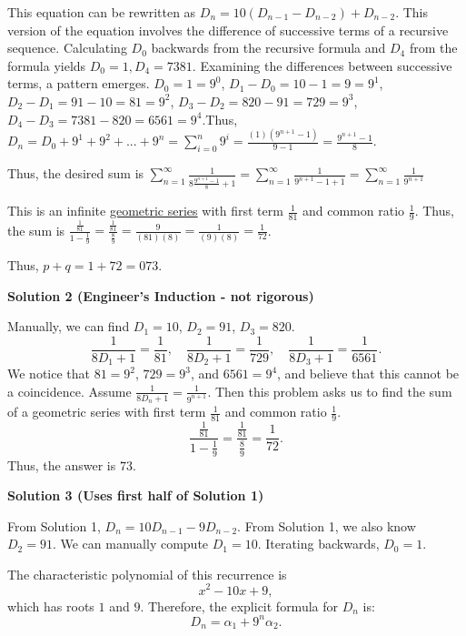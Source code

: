 \begin{enumerate}
 This equation can be rewritten as $D_{n}=10(D_{n-1}-D_{n-2}) + D_{n-2}$. This version of the equation involves the difference of successive terms of a recursive sequence. Calculating $D_{0}$ backwards from the recursive formula and $D_{4}$ from the formula yields $D_{0}=1, D_{4}=7381$. Examining the differences between successive terms, a pattern emerges. $D_{0}=1=9^{0}$, $D_{1}-D_{0}=10-1=9=9^{1}$, $D_{2}-D_{1}=91-10=81=9^{2}$, $D_{3}-D_{2}=820-91=729=9^{3}$, $D_{4}-D_{3}=7381-820=6561=9^{4}$.Thus, $D_{n}=D_{0} + 9^{1}+9^{2}+ . . . +9^{n}=\sum_{i=0}^{n}9^{i}=\frac{(1)(9^{n+1}-1)}{9-1}=\frac{9^{n+1}-1}{8}$.

 Thus, the desired sum is $\sum_{n=1}^{\infty}\frac{1}{8\frac{9^{n+1}-1}{8}+1}=\sum_{n=1}^{\infty}\frac{1}{9^{n+1}-1+1} = \sum_{n=1}^{\infty}\frac{1}{9^{n+1}}$

 This is an infinite \href{https://artofproblemsolving.com/wiki/index.php?title=Geometric\_series}{geometric series} with first term $\frac{1}{81}$ and common ratio $\frac{1}{9}$. Thus, the sum is $\frac{\frac{1}{81}}{1-\frac{1}{9}}=\frac{\frac{1}{81}}{\frac{8}{9}}=\frac{9}{(81)(8)}=\frac{1}{(9)(8)}=\frac{1}{72}$.

 Thus, $p + q = 1 + 72 = \boxed{073}$.

 



\textbf{Solution 2 (Engineer's Induction - not rigorous)}


 Manually, we can find \( D_1 = 10 \), \( D_2 = 91 \), \( D_3 = 820 \).   \[ \frac{1}{8D_1+1} = \frac{1}{81}, \quad \frac{1}{8D_2+1} = \frac{1}{729}, \quad \frac{1}{8D_3+1} = \frac{1}{6561}. \]   We notice that \( 81 = 9^2 \), \( 729 = 9^3 \), and \( 6561 = 9^4 \), and believe that this cannot be a coincidence.    Assume \( \frac{1}{8D_n+1} = \frac{1}{9^{n+1}} \). Then this problem asks us to find the sum of a geometric series with first term \( \frac{1}{81} \) and common ratio \( \frac{1}{9} \).   \[ \frac{\frac{1}{81}}{1 - \frac{1}{9}} = \frac{\frac{1}{81}}{\frac{8}{9}} = \frac{1}{72}. \]    Thus, the answer is \(\boxed{73}\).




\textbf{Solution 3 (Uses first half of Solution 1)}

From Solution 1, \( D_n = 10D_{n-1} - 9D_{n-2} \). From Solution 1, we also know \( D_2 = 91 \).  We can manually compute \( D_1 = 10 \). Iterating backwards, \(D_0 = 1 \).

 The characteristic polynomial of this recurrence is  
 \[x^2 - 10x + 9,\]  which has roots \( 1 \) and \( 9 \).  Therefore, the explicit formula for \( D_n \) is:  
 \[D_n = \alpha_1 + 9^n \alpha_2.\] 


\end{enumerate}
